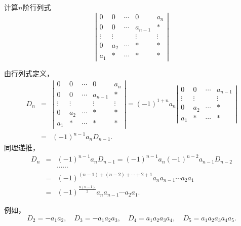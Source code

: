 \begin{frame}
\begin{li}
  计算$n$阶行列式
  $$
  \left|
    \begin{array}{ccccc}
      0  &  0 & \cdots & 0 & a_n \\
      0  &  0 & \cdots & a_{n-1} & * \\
      \vdots & \vdots & & \vdots & \vdots\\  
      0  &  a_2 & \cdots & * & * \\
      a_1 & * & \cdots & * & *
    \end{array}
  \right| 
  $$
\end{li}
\end{frame}

\begin{frame}
\begin{jie}
  由行列式定义，
  $$
  \begin{array}{rcl}
    D_n &=& \left|
            \begin{array}{ccccc}
              0  &  0 & \cdots & 0 & a_n \\
              0  &  0 & \cdots & a_{n-1} & * \\
              \vdots & \vdots & & \vdots & \vdots\\  
              0  &  a_2 & \cdots & * & * \\
              a_1 & * & \cdots & * & *
            \end{array}
                                     \right| =   (-1)^{1+n} a_n \left|
                                     \begin{array}{cccc}
                                       0  &  0 & \cdots &   a_{n-1} \\
                                       \vdots & \vdots &  & \vdots\\  
                                       0  &  a_2 & \cdots  & * \\
                                       a_1 & * & \cdots  & *
                                     \end{array} 
                                                           \right| \\[0.5in]
        &=&  (-1)^{n-1} a_n D_{n-1}.      
  \end{array}
  $$ \pause 
  同理递推，
  $$
  \begin{array}{rcl}
    D_n & =& (-1)^{n-1} a_n D_{n-1}  = (-1)^{n-1} a_n (-1)^{n-2} a_{n-1} D_{n-2} \\[0.1in]
        && \cdots\cdots \\[0.2cm]
        &=&   (-1)^{(n-1)+(n-2)+\cdots+2+1} a_n a_{n-1} \cdots a_2 a_1 \\[0.1in]
        &=&  (-1)^{\frac{n(n-1)}{2}} a_n a_{n-1} \cdots a_2 a_1.
  \end{array}
  $$
\end{jie} \pause 

  例如，
  $$
  D_2 = -a_1a_2, \quad
  D_3 = -a_1a_2a_3, \quad
  D_4 = a_1a_2a_3a_4, \quad
  D_5 = a_1a_2a_3a_4a_5.
  $$

\end{frame}